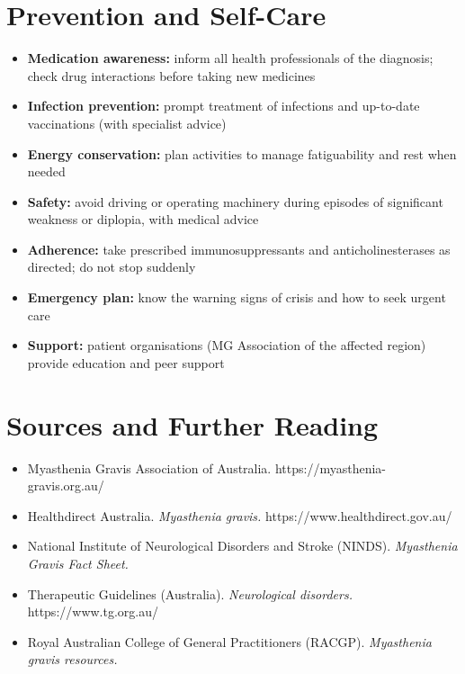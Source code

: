 \section*{Prevention and Self-Care}
\begin{itemize}
    \item \textbf{Medication awareness:} inform all health professionals of the diagnosis; check drug interactions before taking new medicines
    \item \textbf{Infection prevention:} prompt treatment of infections and up-to-date vaccinations (with specialist advice)
    \item \textbf{Energy conservation:} plan activities to manage fatiguability and rest when needed
    \item \textbf{Safety:} avoid driving or operating machinery during episodes of significant weakness or diplopia, with medical advice
    \item \textbf{Adherence:} take prescribed immunosuppressants and anticholinesterases as directed; do not stop suddenly
    \item \textbf{Emergency plan:} know the warning signs of crisis and how to seek urgent care
    \item \textbf{Support:} patient organisations (MG Association of the affected region) provide education and peer support
\end{itemize}

\section*{Sources and Further Reading}
\begin{itemize}
    \item Myasthenia Gravis Association of Australia. https://myasthenia-gravis.org.au/
    \item Healthdirect Australia. \textit{Myasthenia gravis.} https://www.healthdirect.gov.au/
    \item National Institute of Neurological Disorders and Stroke (NINDS). \textit{Myasthenia Gravis Fact Sheet.}
    \item Therapeutic Guidelines (Australia). \textit{Neurological disorders.} https://www.tg.org.au/
    \item Royal Australian College of General Practitioners (RACGP). \textit{Myasthenia gravis resources.}
\end{itemize}

\clearpage
